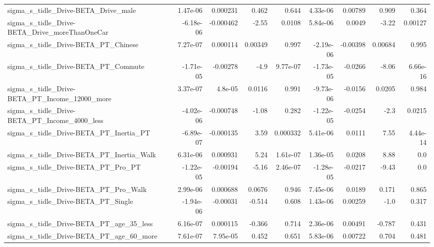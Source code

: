 \begin{tabular}{lrrrrrrrr}
sigma\_s\_tidle\_Drive-BETA\_Drive\_male                &    1.47e-06 &     0.000231 &    0.462 &    0.644 &   4.33e-06 &     0.00789 &        0.909 &         0.364 \\
sigma\_s\_tidle\_Drive-BETA\_Drive\_moreThanOneCar      &   -6.18e-06 &    -0.000462 &    -2.55 &   0.0108 &   5.84e-06 &      0.0049 &        -3.22 &       0.00127 \\
sigma\_s\_tidle\_Drive-BETA\_PT\_Chinese                &    7.27e-07 &     0.000114 &  0.00349 &    0.997 &  -2.19e-06 &    -0.00398 &      0.00684 &         0.995 \\
sigma\_s\_tidle\_Drive-BETA\_PT\_Commute                &   -1.71e-05 &     -0.00278 &     -4.9 & 9.77e-07 &  -1.73e-05 &     -0.0266 &        -8.06 &      6.66e-16 \\
sigma\_s\_tidle\_Drive-BETA\_PT\_Income\_12000\_more      &    3.37e-07 &      4.8e-05 &   0.0116 &    0.991 &  -9.73e-06 &     -0.0156 &       0.0205 &         0.984 \\
sigma\_s\_tidle\_Drive-BETA\_PT\_Income\_4000\_less       &   -4.02e-06 &    -0.000748 &    -1.08 &    0.282 &  -1.22e-05 &     -0.0254 &         -2.3 &        0.0215 \\
sigma\_s\_tidle\_Drive-BETA\_PT\_Inertia\_PT             &   -6.89e-07 &    -0.000135 &     3.59 & 0.000332 &   5.41e-06 &      0.0111 &         7.55 &      4.44e-14 \\
sigma\_s\_tidle\_Drive-BETA\_PT\_Inertia\_Walk           &    6.31e-06 &     0.000931 &     5.24 & 1.61e-07 &   1.36e-05 &      0.0208 &         8.88 &           0.0 \\
sigma\_s\_tidle\_Drive-BETA\_PT\_Pro\_PT                 &   -1.22e-05 &     -0.00194 &    -5.16 & 2.46e-07 &  -1.28e-05 &     -0.0217 &        -9.43 &           0.0 \\
sigma\_s\_tidle\_Drive-BETA\_PT\_Pro\_Walk               &    2.99e-06 &     0.000688 &   0.0676 &    0.946 &   7.45e-06 &      0.0189 &        0.171 &         0.865 \\
sigma\_s\_tidle\_Drive-BETA\_PT\_Single                 &   -1.94e-06 &     -0.00031 &   -0.514 &    0.608 &   1.43e-06 &     0.00259 &         -1.0 &         0.317 \\
sigma\_s\_tidle\_Drive-BETA\_PT\_age\_35\_less            &    6.16e-07 &     0.000115 &   -0.366 &    0.714 &   2.36e-06 &     0.00491 &       -0.787 &         0.431 \\
sigma\_s\_tidle\_Drive-BETA\_PT\_age\_60\_more            &    7.61e-07 &     7.95e-05 &    0.452 &    0.651 &   5.83e-06 &     0.00722 &        0.704 &         0.481 \\

\end{tabular}
